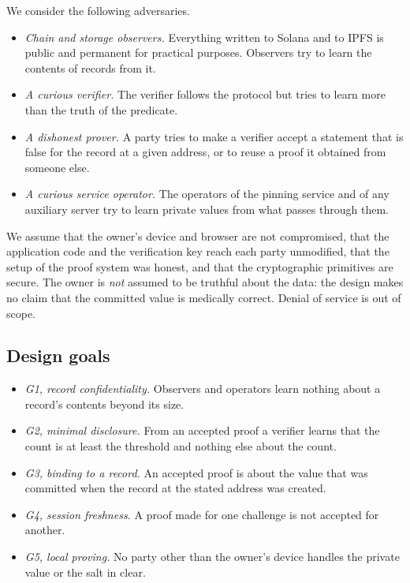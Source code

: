 We consider the following adversaries.
\begin{itemize}
  \item \emph{Chain and storage observers.} Everything written to Solana
  and to IPFS is public and permanent for practical purposes. Observers try
  to learn the contents of records from it.
  \item \emph{A curious verifier.} The verifier follows the protocol but
  tries to learn more than the truth of the predicate.
  \item \emph{A dishonest prover.} A party tries to make a verifier accept a
  statement that is false for the record at a given address, or to reuse a
  proof it obtained from someone else.
  \item \emph{A curious service operator.} The operators of the pinning
  service and of any auxiliary server try to learn private values from what
  passes through them.
\end{itemize}

We assume that the owner's device and browser are not compromised, that the
application code and the verification key reach each party unmodified, that
the setup of the proof system was honest, and that the cryptographic
primitives are secure. The owner is \emph{not} assumed to be truthful about
the data: the design makes no claim that the committed value is medically
correct. Denial of service is out of scope.

\subsection{Design goals}

\begin{itemize}
  \item \emph{G1, record confidentiality.} Observers and operators learn
  nothing about a record's contents beyond its size.
  \item \emph{G2, minimal disclosure.} From an accepted proof a verifier
  learns that the count is at least the threshold and nothing else about the
  count.
  \item \emph{G3, binding to a record.} An accepted proof is about the value
  that was committed when the record at the stated address was created.
  \item \emph{G4, session freshness.} A proof made for one challenge is not
  accepted for another.
  \item \emph{G5, local proving.} No party other than the owner's device
  handles the private value or the salt in clear.
\end{itemize}

